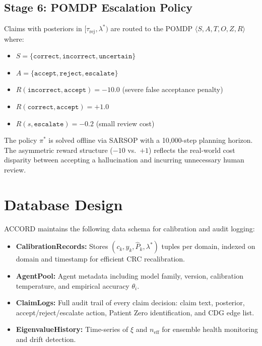 \documentclass[12pt,a4paper]{report}
\begin{document}
\subsection{Stage 6: POMDP Escalation Policy}

Claims with posteriors in $[\tau_{\text{rej}}, \lambda^*)$ are routed to the POMDP $\langle S, A, T, O, Z, R \rangle$ where:
\begin{itemize}
    \item $S = \{\texttt{correct}, \texttt{incorrect}, \texttt{uncertain}\}$
    \item $A = \{\texttt{accept}, \texttt{reject}, \texttt{escalate}\}$
    \item $R(\texttt{incorrect}, \texttt{accept}) = -10.0$ (severe false acceptance penalty)
    \item $R(\texttt{correct}, \texttt{accept}) = +1.0$
    \item $R(s, \texttt{escalate}) = -0.2$ (small review cost)
\end{itemize}
The policy $\pi^*$ is solved offline via SARSOP with a 10,000-step planning horizon. The asymmetric reward structure ($-10$ vs.\ $+1$) reflects the real-world cost disparity between accepting a hallucination and incurring unnecessary human review.

\section{Database Design}

ACCORD maintains the following data schema for calibration and audit logging:

\begin{itemize}
    \item \textbf{CalibrationRecords:} Stores $(c_k, y_k, \hat{P}_k, \lambda^*)$ tuples per domain, indexed on domain and timestamp for efficient CRC recalibration.
    \item \textbf{AgentPool:} Agent metadata including model family, version, calibration temperature, and empirical accuracy $\theta_i$.
    \item \textbf{ClaimLogs:} Full audit trail of every claim decision: claim text, posterior, accept/reject/escalate action, Patient Zero identification, and CDG edge list.
    \item \textbf{EigenvalueHistory:} Time-series of $\xi$ and $n_{\text{eff}}$ for ensemble health monitoring and drift detection.
\end{itemize}

\end{document}
